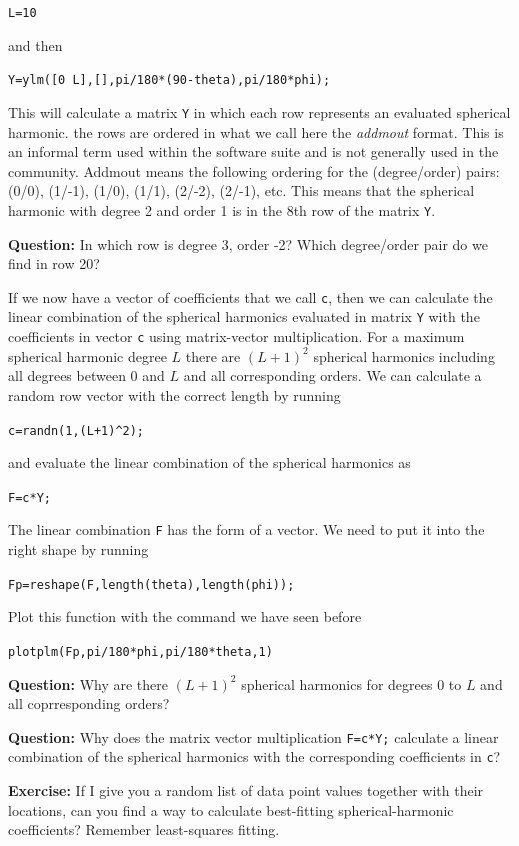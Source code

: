 \documentclass[11pt]{article}
\begin{document}
\quad \verb+L=10+

and then

\quad \verb+Y=ylm([0 L],[],pi/180*(90-theta),pi/180*phi);+

This will calculate a matrix \verb+Y+ in which each row represents an
evaluated spherical harmonic. the rows are ordered in what we call
here the \emph{addmout} format. This is an informal term used within
the software suite and is not generally used in the community. Addmout
means the following ordering for the (degree/order) pairs: (0/0),
(1/-1), (1/0), (1/1), (2/-2), (2/-1), etc. This means that the
spherical harmonic with degree 2 and order 1 is in the 8th row of the
matrix \verb+Y+.
   
\textbf{Question:} In which row is degree 3, order -2? Which
degree/order pair do we find in row 20?

If we now have a vector of coefficients that we call \verb+c+, then we
can calculate the linear combination of the spherical harmonics
evaluated in matrix \verb+Y+ with the coefficients in vector \verb+c+
using matrix-vector multiplication. For a maximum spherical harmonic
degree $L$ there are $(L+1)^2$ spherical harmonics including all
degrees between 0 and $L$ and all corresponding orders.  We can
calculate a random row vector with the correct length by running

\quad \verb!c=randn(1,(L+1)^2);!
   
and evaluate the linear combination of the spherical harmonics as

\quad \verb!F=c*Y;!

The linear combination \verb!F! has the form of a vector. We need to
put it into the right shape by running

\quad \verb!Fp=reshape(F,length(theta),length(phi));!

Plot this function with the command we have seen before

\qquad \verb+plotplm(Fp,pi/180*phi,pi/180*theta,1)+

\textbf{Question:} Why are there $(L+1)^2$ spherical harmonics for
degrees 0 to $L$ and all coprresponding orders?

\textbf{Question:} Why does the matrix vector multiplication
\verb!F=c*Y;! calculate a linear combination of the spherical
harmonics with the corresponding coefficients in \verb+c+?


\textbf{Exercise:} If I give you a random list of data point values
together with their locations, can you find a way to calculate
best-fitting spherical-harmonic coefficients? Remember least-squares
fitting.
\end{document}
